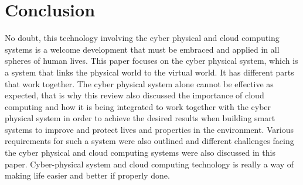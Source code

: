 \documentclass[english]{lni}
\begin{document}

\section{Conclusion}
No doubt, this technology involving the cyber physical and cloud computing systems is a welcome development that must be embraced and  applied in all spheres of human lives. This paper focuses on the cyber physical system, which is a system that links the physical world to the virtual world. It has different parts that work together. The cyber physical system alone cannot be effective as expected, that is why this review also discussed the importance of cloud computing and how it is being integrated to work together with the cyber physical system in order to achieve the desired results when building smart systems to improve and protect lives and properties in the environment. Various requirements for such a system were also outlined and different  challenges facing the cyber physical and cloud computing systems were also discussed in this paper. Cyber-physical system and cloud computing technology is really a way of making life easier and better if properly done.

\end{document}
